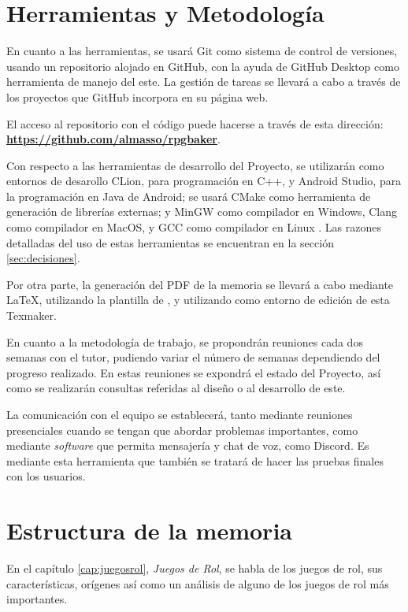 \section{Herramientas y Metodología}
En cuanto a las herramientas, se usará Git como sistema de control de versiones, usando un repositorio alojado en GitHub, con la ayuda de GitHub Desktop como herramienta de manejo del este. La gestión de tareas se llevará a cabo a través de los proyectos que GitHub incorpora en su página web.

\smallskip

El acceso al repositorio con el código puede hacerse a través de esta dirección: \href{https://github.com/almasso/rpgbaker}{\textbf{https://github.com/almasso/rpgbaker}}.

\medskip

Con respecto a las herramientas de desarrollo del Proyecto, se utilizarán como entornos de desarollo CLion, para programación en C++, y Android Studio, para la programación en Java de Android; se usará CMake como herramienta de generación de librerías externas; y MinGW como compilador en Windows, Clang como compilador en MacOS, y GCC como compilador en Linux . Las razones detalladas del uso de estas herramientas se encuentran en la sección \ref{sec:decisiones}.

\medskip

Por otra parte, la generación del PDF de la memoria se llevará a cabo mediante \LaTeX , utilizando la plantilla de \texis , y utilizando como entorno de edición de esta Texmaker.

\bigskip

En cuanto a la metodología de trabajo, se propondrán reuniones cada dos semanas con el tutor, pudiendo variar el número de semanas dependiendo del progreso realizado. En estas reuniones se expondrá el estado del Proyecto, así como se realizarán consultas referidas al diseño o al desarrollo de este.

\medskip

La comunicación con el equipo se establecerá, tanto mediante reuniones presenciales cuando se tengan que abordar problemas importantes, como mediante \textit{software} que permita mensajería y chat de voz, como Discord. Es mediante esta herramienta que también se tratará de hacer las pruebas finales con los usuarios.

\section{Estructura de la memoria} 
En el capítulo \ref{cap:juegosrol}, \textit{Juegos de Rol}, se habla de los juegos de rol, sus características, orígenes así como un análisis de alguno de los juegos de rol más importantes.

